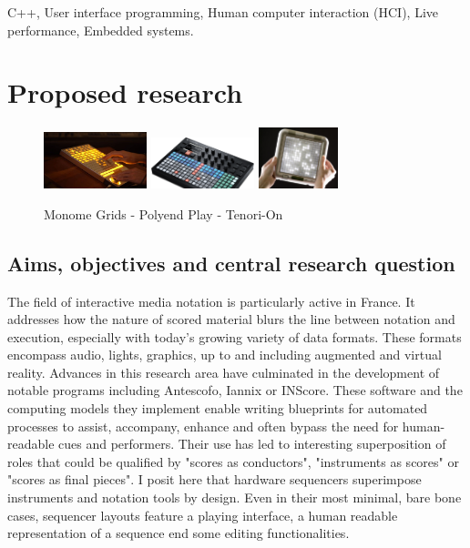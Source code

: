 \documentclass[journal,onecolumn]{IEEEtran}
\begin{document}
\begin{IEEEkeywords}
C++, User interface programming, Human computer interaction (HCI), Live performance, Embedded systems.
\end{IEEEkeywords}

\newpage
\section{Proposed research} %

\begin{figure}[!t]
\centering
\includegraphics[width=3cm]{pictures/monome-gridlab.jpg}
\includegraphics[width=3cm]{pictures/polyend-play.png}
\includegraphics[width=2.3cm]{pictures/tenori-on.jpg}
\caption[]{Monome Grids
- Polyend Play
- Tenori-On
}
\label{fig:seqs}
\end{figure}

\subsection{Aims, objectives and central research question}
The field of interactive media notation is particularly active in France. It addresses how the nature of scored material blurs the line between notation and execution, especially with today's growing variety of data formats. 
These formats encompass audio, lights, graphics, up to and including augmented and virtual reality. 
Advances in this research area have culminated in the development of notable programs including Antescofo\cite{ircam:antescofo}, Iannix\cite{buzzing:iannix} or INScore\cite{grame:inscore}.
These software and the computing models they implement enable writing blueprints for automated processes to assist, accompany, enhance and often bypass the need for human-readable cues and performers. Their use has led to interesting superposition of roles that could be qualified by "scores as conductors", "instruments as scores" or "scores as final pieces". I posit here that hardware sequencers superimpose instruments and notation tools by design. Even in their most minimal, bare bone cases, sequencer layouts feature a playing interface, a human readable representation of a sequence end some editing functionalities. 
\end{document}
